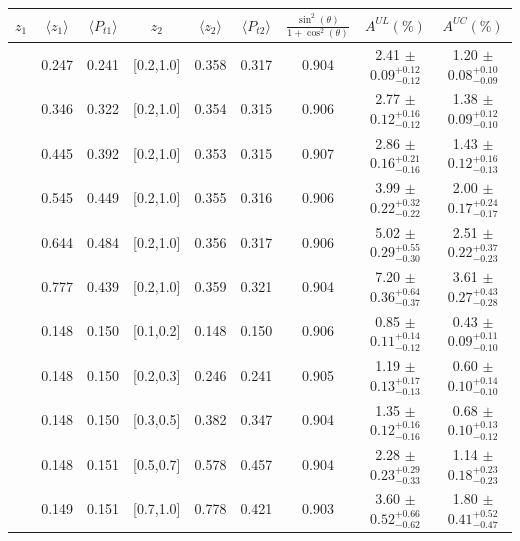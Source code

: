 \begin{table}[H]\scriptsize
\centering
\renewcommand{\arraystretch}{1.5}
\begin{tabular}{|c|c|c|c|c|c|c|c|c|}
\hline
$z_1$ & $\langle  z_1 \rangle$ & $\langle  P_{t1}  \rangle$ & $z_2$ &  $\langle  z_2 \rangle$ & $\langle  P_{t2}\rangle$  &$\frac{\sin^2(\theta)}{1+\cos^2(\theta)}$ & $A^{UL}(\%)$ &  $A^{UC}(\%)$   \\ \hline
[0.2,0.3]	&	0.247	&	0.241	&	[0.2,1.0]	&	0.358	&	0.317	&	0.904	&	2.41	$\pm$ $	0.09	_{	-0.12	}^{+	0.12	}$&	1.20	$\pm$ $	0.08	_{	-0.09	}^{+	0.10	}$\\ \hline
[0.3,0.4]	&	0.346	&	0.322	&	[0.2,1.0]	&	0.354	&	0.315	&	0.906	&	2.77	$\pm$ $	0.12	_{	-0.12	}^{+	0.16	}$&	1.38	$\pm$ $	0.09	_{	-0.10	}^{+	0.12	}$\\ \hline
[0.4,0.5]	&	0.445	&	0.392	&	[0.2,1.0]	&	0.353	&	0.315	&	0.907	&	2.86	$\pm$ $	0.16	_{	-0.16	}^{+	0.21	}$&	1.43	$\pm$ $	0.12	_{	-0.13	}^{+	0.16	}$\\ \hline
[0.5,0.6]	&	0.545	&	0.449	&	[0.2,1.0]	&	0.355	&	0.316	&	0.906	&	3.99	$\pm$ $	0.22	_{	-0.22	}^{+	0.32	}$&	2.00	$\pm$ $	0.17	_{	-0.17	}^{+	0.24	}$\\ \hline
[0.6,0.7]	&	0.644	&	0.484	&	[0.2,1.0]	&	0.356	&	0.317	&	0.906	&	5.02	$\pm$ $	0.29	_{	-0.30	}^{+	0.55	}$&	2.51	$\pm$ $	0.22	_{	-0.23	}^{+	0.37	}$\\ \hline
[0.7,1.0]	&	0.777	&	0.439	&	[0.2,1.0]	&	0.359	&	0.321	&	0.904	&	7.20	$\pm$ $	0.36	_{	-0.37	}^{+	0.64	}$&	3.61	$\pm$ $	0.27	_{	-0.28	}^{+	0.43	}$\\ \hline
[0.1,0.2]	&	0.148	&	0.150	&	[0.1,0.2]	&	0.148	&	0.150	&	0.906	&	0.85	$\pm$ $	0.11	_{	-0.12	}^{+	0.14	}$&	0.43	$\pm$ $	0.09	_{	-0.10	}^{+	0.11	}$\\ \hline
[0.1,0.2]	&	0.148	&	0.150	&	[0.2,0.3]	&	0.246	&	0.241	&	0.905	&	1.19	$\pm$ $	0.13	_{	-0.13	}^{+	0.17	}$&	0.60	$\pm$ $	0.10	_{	-0.10	}^{+	0.14	}$\\ \hline
[0.1,0.2]	&	0.148	&	0.150	&	[0.3,0.5]	&	0.382	&	0.347	&	0.904	&	1.35	$\pm$ $	0.12	_{	-0.16	}^{+	0.16	}$&	0.68	$\pm$ $	0.10	_{	-0.12	}^{+	0.13	}$\\ \hline
[0.1,0.2]	&	0.148	&	0.151	&	[0.5,0.7]	&	0.578	&	0.457	&	0.904	&	2.28	$\pm$ $	0.23	_{	-0.33	}^{+	0.29	}$&	1.14	$\pm$ $	0.18	_{	-0.23	}^{+	0.23	}$\\ \hline
[0.1,0.2]	&	0.149	&	0.151	&	[0.7,1.0]	&	0.778	&	0.421	&	0.903	&	3.60	$\pm$ $	0.52	_{	-0.62	}^{+	0.66	}$&	1.80	$\pm$ $	0.41	_{	-0.47	}^{+	0.52	}$\\ \hline

\end{tabular}
\end{table}
